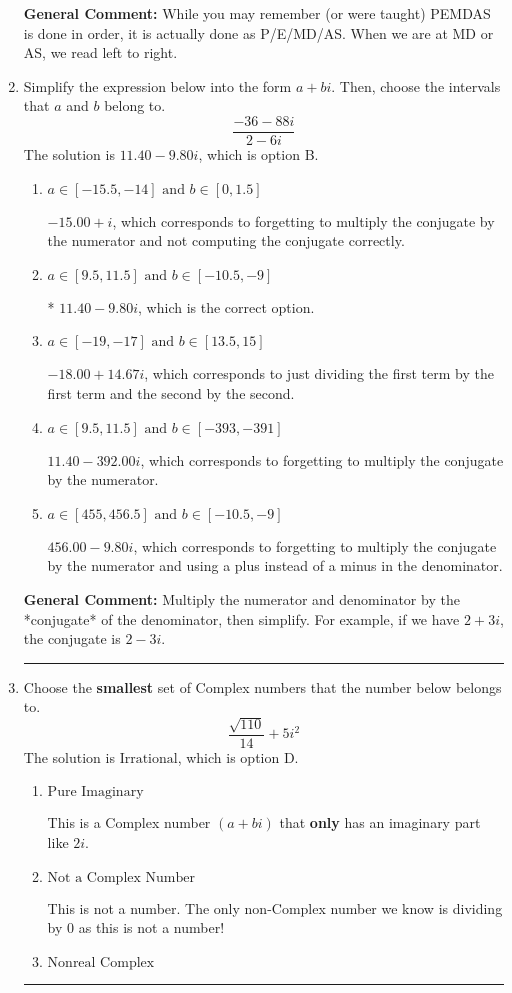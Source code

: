 \documentclass{extbook}[14pt]
\newcommand{\litem}[1]{\item #1

\rule{\textwidth}{0.4pt}}
\begin{document}
\begin{enumerate}
{\textbf{General Comment:} While you may remember (or were taught) PEMDAS is done in order, it is actually done as P/E/MD/AS. When we are at MD or AS, we read left to right.
}
\litem{
Simplify the expression below into the form $a+bi$. Then, choose the intervals that $a$ and $b$ belong to.
\[ \frac{-36 - 88 i}{2 - 6 i} \]The solution is \( 11.40  - 9.80 i \), which is option B.\begin{enumerate}[label=\Alph*.]
\item \( a \in [-15.5, -14] \text{ and } b \in [0, 1.5] \)

 $-15.00 + i$, which corresponds to forgetting to multiply the conjugate by the numerator and not computing the conjugate correctly.
\item \( a \in [9.5, 11.5] \text{ and } b \in [-10.5, -9] \)

* $11.40  - 9.80 i$, which is the correct option.
\item \( a \in [-19, -17] \text{ and } b \in [13.5, 15] \)

 $-18.00  + 14.67 i$, which corresponds to just dividing the first term by the first term and the second by the second.
\item \( a \in [9.5, 11.5] \text{ and } b \in [-393, -391] \)

 $11.40  - 392.00 i$, which corresponds to forgetting to multiply the conjugate by the numerator.
\item \( a \in [455, 456.5] \text{ and } b \in [-10.5, -9] \)

 $456.00  - 9.80 i$, which corresponds to forgetting to multiply the conjugate by the numerator and using a plus instead of a minus in the denominator.
\end{enumerate}

\textbf{General Comment:} Multiply the numerator and denominator by the *conjugate* of the denominator, then simplify. For example, if we have $2+3i$, the conjugate is $2-3i$.
}
\litem{
Choose the \textbf{smallest} set of Complex numbers that the number below belongs to.
\[ \frac{\sqrt{110}}{14}+5i^2 \]The solution is \( \text{Irrational} \), which is option D.\begin{enumerate}[label=\Alph*.]
\item \( \text{Pure Imaginary} \)

This is a Complex number $(a+bi)$ that \textbf{only} has an imaginary part like $2i$.
\item \( \text{Not a Complex Number} \)

This is not a number. The only non-Complex number we know is dividing by 0 as this is not a number!
\item \( \text{Nonreal Complex} \)


\end{enumerate}}
\end{enumerate}
\end{document}
